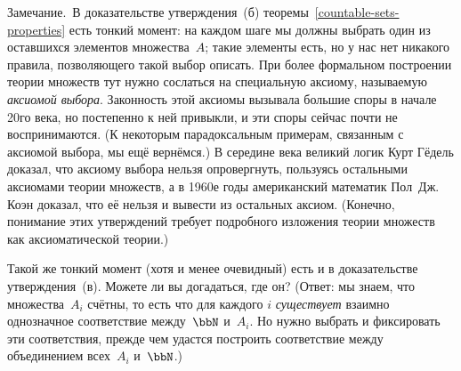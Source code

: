\label{axiom-of-choice}%
\textsf{Замечание.}~В доказательстве утверждения~(б)
теоремы~\ref{countable-sets-properties}
есть тонкий момент: на
каждом шаге мы должны выбрать один из оставшихся элементов
множества~$A$; такие элементы есть, но у нас нет никакого
правила, позволяющего такой выбор описать. При более формальном
построении теории множеств тут нужно сослаться на специальную
аксиому, называемую \emph{аксиомой выбора}.
Законность этой
аксиомы вызывала большие споры в начале 20\д го века, но
постепенно к ней привыкли, и эти споры сейчас почти не
воспринимаются. (К некоторым парадоксальным примерам,
связанным с аксиомой выбора, мы ещё вернёмся.)
В середине века великий логик Курт
Гёдель доказал, что аксиому выбора
нельзя опровергнуть, пользуясь остальными аксиомами теории
множеств, а в 1960\д е годы американский математик
Пол~Дж.\,Коэн доказал, что её нельзя и вывести
из остальных аксиом. (Конечно, понимание этих утверждений
требует подробного изложения теории множеств как аксиоматической
теории.)

\begin{problem}
Такой же тонкий момент (хотя и менее очевидный) есть и в
доказательстве утверждения~(в). Можете ли вы догадаться,
где он? (Ответ: мы знаем, что множества~$A_i$ счётны,
то есть что для каждого $i$
\textsl{существует} взаимно однозначное
соответствие между~$\bbN$ и~$A_i$. Но нужно
выбрать и фиксировать эти соответствия, прежде чем
удастся построить соответствие между объединением всех~$A_i$
и~$\bbN$.)
\end{problem}

